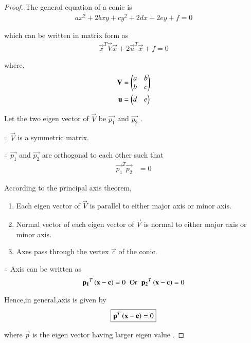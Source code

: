 \documentclass[journal,12pt,twocolumn]{IEEEtran}
\begin{document}
\begin{proof}
The general equation of a conic is
\begin{align}
  ax^2+2bxy+cy^2+2dx+2ey+f=0
\end{align}

which can be written in matrix form as
\begin{align}
    \vec{x}^T\vec{V}\vec{x} + 2\vec{u}^T\vec{x} + f =0
\end{align}

where,
\begin{align}
    \mathbf{V} &=\begin{pmatrix}a & b \\ b& c\end{pmatrix}
    \\
    \mathbf{u} &= \begin{pmatrix}d & e\end{pmatrix}
\end{align}

Let the two eigen vector of $\vec{V}$ be $\vec{p_1}$ and $\vec{p_2}$ .

$\because$ $\vec{V}$ is a symmetric matrix. 

$\therefore$ $\vec{p_1}$ and $\vec{p_2}$ are orthogonal to each other such that
\begin{align}
    \vec{p_1}^T\vec{p_2} &= 0
\end{align}

According to the principal axis theorem,
\begin{enumerate}
    \item Each eigen vector of $\vec{V}$ is parallel to either major axis or minor axis.
    \item Normal vector of each eigen vector of $\vec{V}$ is normal to either major axis or minor axis.
    \item Axes pass through the vertex $\vec{c}$ of the conic.
\end{enumerate}

$\therefore$ Axis can be written as
\begin{align}
    \mathbf{p_1}^T\left(\mathbf{x}-\mathbf{c}\right) = 0 \hspace{0.2cm} \text{Or} \hspace{0.2cm} \mathbf{p_2}^T\left(\mathbf{x}-\mathbf{c}\right) = 0
\end{align}

Hence,in general,axis is given by
\begin{align}
    \boxed{\mathbf{p}^T\left(\mathbf{x}-\mathbf{c}\right)=0}
\end{align}

where $\vec{p}$ is the eigen vector having larger eigen value .

\end{proof}
\end{document}
